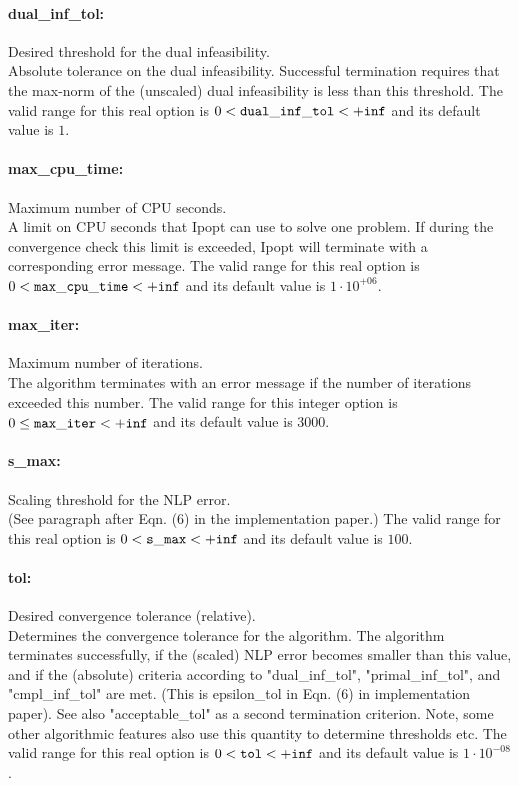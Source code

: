\paragraph{dual\_inf\_tol:}\label{sec:dual_inf_tol} Desired threshold for the dual infeasibility. $\;$ \\
 Absolute tolerance on the dual infeasibility.
Successful termination requires that the max-norm
of the (unscaled) dual infeasibility is less than
this threshold. The valid range for this real option is 
$0 <  {\tt dual\_inf\_tol } <  {\tt +inf}$
and its default value is $1$.


\paragraph{max\_cpu\_time:}\label{sec:max_cpu_time} Maximum number of CPU seconds. $\;$ \\
 A limit on CPU seconds that Ipopt can use to
solve one problem.  If during the convergence
check this limit is exceeded, Ipopt will
terminate with a corresponding error message. The valid range for this real option is 
$0 <  {\tt max\_cpu\_time } <  {\tt +inf}$
and its default value is $1 \cdot 10^{+06}$.


\paragraph{max\_iter:}\label{sec:max_iter} Maximum number of iterations. $\;$ \\
 The algorithm terminates with an error message if
the number of iterations exceeded this number. The valid range for this integer option is
$0 \le {\tt max\_iter } <  {\tt +inf}$
and its default value is $3000$.


\paragraph{s\_max:}\label{sec:s_max} Scaling threshold for the NLP error. $\;$ \\
 (See paragraph after Eqn. (6) in the
implementation paper.) The valid range for this real option is 
$0 <  {\tt s\_max } <  {\tt +inf}$
and its default value is $100$.


\paragraph{tol:}\label{sec:tol} Desired convergence tolerance (relative). $\;$ \\
 Determines the convergence tolerance for the
algorithm.  The algorithm terminates
successfully, if the (scaled) NLP error becomes
smaller than this value, and if the (absolute)
criteria according to "dual\_inf\_tol",
"primal\_inf\_tol", and "cmpl\_inf\_tol" are met.
 (This is epsilon\_tol in Eqn. (6) in
implementation paper).  See also
"acceptable\_tol" as a second termination
criterion.  Note, some other algorithmic features
also use this quantity to determine thresholds
etc. The valid range for this real option is 
$0 <  {\tt tol } <  {\tt +inf}$
and its default value is $1 \cdot 10^{-08}$.


